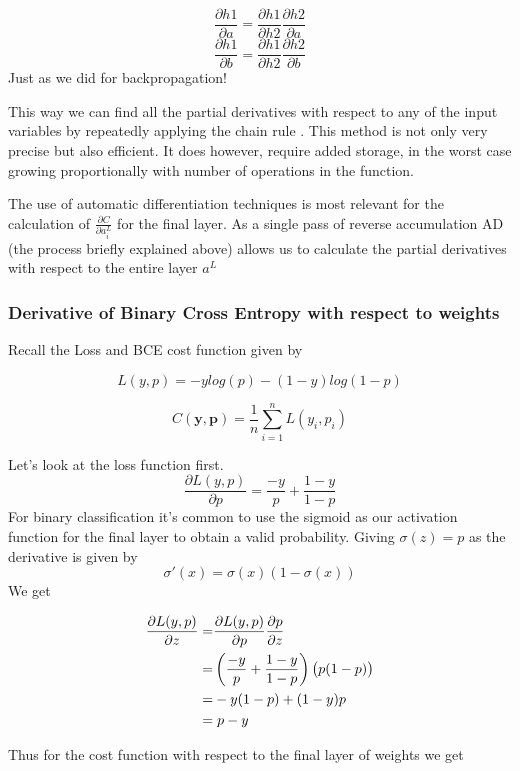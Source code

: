 \documentclass{article}
\theoremstyle{definition}
\begin{document}
\[
\frac{\partial h1}{\partial a} =  \frac{\partial h1}{\partial h2} \frac{\partial h2}{\partial a}
\]
\[
\frac{\partial h1}{\partial b} =  \frac{\partial h1}{\partial h2} \frac{\partial h2}{\partial b}
\]
Just as we did for backpropagation!

This way we can find all the partial derivatives with respect to any of the input variables by repeatedly applying the chain rule \parencite{walther2007automatic} . This method is not only very precise but also efficient. It does however, require added storage, in the worst case growing proportionally with number of operations in the function.
\parencite{baydin2018automatic}

The use of automatic differentiation techniques is most relevant for the calculation of $\frac{\partial C}{\partial a_i^L}$ for the final layer. As a single pass of reverse accumulation AD (the process briefly explained above) allows us to calculate the partial derivatives with respect to the entire layer $a^L$


\subsubsection{Derivative of Binary Cross Entropy with respect to weights}
Recall the Loss and BCE cost function given by

\[
L(y, p) = -ylog(p) - (1-y)log(1-p)
\]

\[
C(\mathbf{y}, \mathbf{p}) = \frac{1}{n} \sum_{i=1}^{n} L(y_i, p_i)
\]


Let's look at the loss function first.
\[
\frac{\partial L(y,p)}{\partial p} = \frac{-y}{p} + \frac{1-y}{1-p} 
\]
For binary classification it's common to use the sigmoid as our activation function for the final layer to obtain a valid probability. Giving $\sigma(z) = p$ as the derivative is given by
\[
\sigma'(x) = \sigma(x)(1-\sigma(x))
\]
We get 

\begin{align*}
\frac{\partial L(y,p)}{\partial z} =& \frac{\partial L(y,p)}{\partial p} \frac{\partial p}{\partial z} \\
=& \left(\frac{-y}{p} + \frac{1-y}{1-p}\right) \left(p(1-p)\right)\\
=& -y(1-p) + (1-y)p\\
=& \hspace{1mm} p-y 
\end{align*}

Thus for the cost function with respect to the final layer of weights we get
\end{document}
